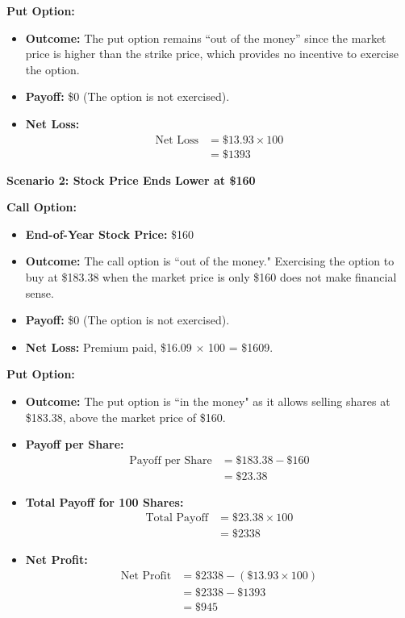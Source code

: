 \documentclass{article}
\begin{document}
\textbf{Put Option:}
\begin{itemize}
    \item \textbf{Outcome:} The put option remains ``out of the money'' since the market price is higher than the strike price, which provides no incentive to exercise the option.
    \item \textbf{Payoff:} \$0 (The option is not exercised).
    \item \textbf{Net Loss:}
    \begin{align*}
        \text{Net Loss} &= \$13.93 \times 100 \\
                        &= \$1393
    \end{align*}
\end{itemize}

\vspace{1em}
\textbf{Scenario 2: Stock Price Ends Lower at \$160}

\vspace{1em}

\textbf{Call Option:}
\begin{itemize}
    \item \textbf{End-of-Year Stock Price:} \$160
    \item \textbf{Outcome:} The call option is ``out of the money." Exercising the option to buy at \$183.38 when the market price is only \$160 does not make financial sense.
    \item \textbf{Payoff:} \$0 (The option is not exercised).
    \item \textbf{Net Loss:} Premium paid, \$16.09 $\times$ 100 = \$1609.
\end{itemize}

\textbf{Put Option:}
\begin{itemize}
    \item \textbf{Outcome:} The put option is ``in the money" as it allows selling shares at \$183.38, above the market price of \$160.
    \item \textbf{Payoff per Share:}
    \begin{align*}
        \text{Payoff per Share} &= \$183.38 - \$160 \\
                                &= \$23.38
    \end{align*}
    \item \textbf{Total Payoff for 100 Shares:}
    \begin{align*}
        \text{Total Payoff} &= \$23.38 \times 100 \\
                            &= \$2338
    \end{align*}
    \item \textbf{Net Profit:}
    \begin{align*}
        \text{Net Profit} &= \$2338 - (\$13.93 \times 100) \\
                          &= \$2338 - \$1393 \\
                          &= \$945
    \end{align*}
\end{itemize}
\end{document}
